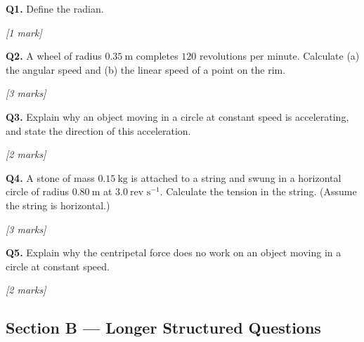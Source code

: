 \begin{tcolorbox}[colback=white, colframe=midblue, breakable]

\begin{minipage}{\linewidth}
\textbf{Q1.} Define the radian.
\par\hfill\textit{[1 mark]}
\vspace{2.0cm}
\end{minipage}

\begin{minipage}{\linewidth}
\textbf{Q2.} A wheel of radius $0.35\ \text{m}$ completes $120$ revolutions per minute. Calculate (a) the angular speed and (b) the linear speed of a point on the rim.
\par\hfill\textit{[3 marks]}
\vspace{3.5cm}
\end{minipage}

\begin{minipage}{\linewidth}
\textbf{Q3.} Explain why an object moving in a circle at constant speed is accelerating, and state the direction of this acceleration.
\par\hfill\textit{[2 marks]}
\vspace{3.0cm}
\end{minipage}

\begin{minipage}{\linewidth}
\textbf{Q4.} A stone of mass $0.15\ \text{kg}$ is attached to a string and swung in a horizontal circle of radius $0.80\ \text{m}$ at $3.0\ \text{rev s}^{-1}$. Calculate the tension in the string. (Assume the string is horizontal.)
\par\hfill\textit{[3 marks]}
\vspace{3.5cm}
\end{minipage}

\begin{minipage}{\linewidth}
\textbf{Q5.} Explain why the centripetal force does no work on an object moving in a circle at constant speed.
\par\hfill\textit{[2 marks]}
\vspace{2.5cm}
\end{minipage}

\end{tcolorbox}

\subsection*{Section B — Longer Structured Questions}

